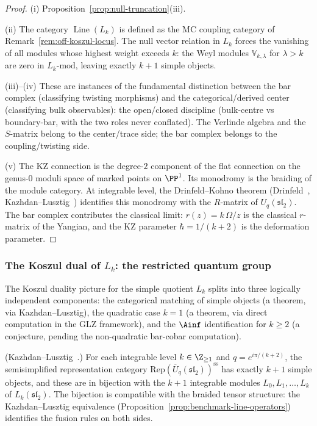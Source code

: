 \begin{proof}
(i) Proposition~\ref{prop:null-truncation}(iii).

(ii) The category $\operatorname{Line}(L_k)$ is defined as the
MC coupling category of
Remark~\ref{rem:off-koszul-locus}. The null vector relation
in $L_k$ forces the vanishing of all modules whose
highest weight exceeds $k$: the Weyl modules
$\mathbb{V}_{k,\lambda}$ for $\lambda > k$ are zero in
$L_k\text{-mod}$, leaving exactly $k + 1$ simple objects.

(iii)--(iv) These are instances of the fundamental distinction
between the bar complex (classifying twisting morphisms) and
the categorical/derived center (classifying bulk observables):
the open/closed discipline (bulk-centre vs boundary-bar, with the two
roles never conflated). The Verlinde algebra and the
$S$-matrix belong to the center/trace side; the bar complex
belongs to the coupling/twisting side.

(v) The KZ connection is the degree-$2$ component of the flat
connection on the genus-$0$ moduli space of marked points on
$\PP^1$. Its monodromy is the braiding of the module category.
At integrable level, the Drinfeld--Kohno theorem
(Drinfeld~\cite{Dri89}, Kazhdan--Lusztig~\cite{KL93})
identifies this monodromy with the $R$-matrix of
$U_q(\mathfrak{sl}_2)$. The bar complex contributes the
classical limit: $r(z) = k\,\Omega/z$ is the classical
$r$-matrix of the Yangian, and the KZ parameter
$\hbar = 1/(k+2)$ is the deformation parameter.
\end{proof}


\subsubsection{The Koszul dual of $L_k$:
 the restricted quantum group}
\label{subsubsec:conjectural-Lk-koszul-dual}

The Koszul duality picture for the simple quotient $L_k$
splits into three logically independent components: the
categorical matching of simple objects (a theorem, via
Kazhdan--Lusztig), the quadratic case $k = 1$ (a theorem,
via direct computation in the GLZ framework), and the
$\Ainf$ identification for $k \ge 2$ (a conjecture, pending
the non-quadratic bar-cobar computation).

\begin{proposition}
\label{prop:Lk-rep-matching}
\textup{(Kazhdan--Lusztig~\cite{KL93}.)}
For each integrable level $k \in \Z_{\ge 1}$ and
$q = e^{i\pi/(k+2)}$, the semisimplified representation
category
$\mathrm{Rep}(\overline{U}_q(\mathfrak{sl}_2))^{\mathrm{ss}}$
has exactly $k + 1$ simple objects, and these are in
bijection with the $k + 1$ integrable modules
$L_0, L_1, \ldots, L_k$ of $L_k(\mathfrak{sl}_2)$. The
bijection is compatible with the braided tensor structure:
the Kazhdan--Lusztig equivalence
\textup{(}Proposition~\textup{\ref{prop:benchmark-line-operators}}\textup{)}
identifies the fusion rules on both sides.
\end{proposition}

